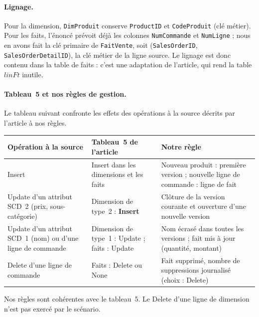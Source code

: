 \documentclass[10pt,a4paper]{article}
\begin{document}
\paragraph{Lignage.} Pour la dimension, \texttt{DimProduit} conserve \texttt{ProductID} et \texttt{CodeProduit} (clé métier). Pour les faits, l'énoncé prévoit déjà les colonnes \texttt{NumCommande} et \texttt{NumLigne} ; nous en avons fait la clé primaire de \texttt{FaitVente}, soit (\texttt{SalesOrderID}, \texttt{SalesOrderDetailID}), la clé métier de la ligne source. Le lignage est donc contenu dans la table de faits : c'est une adaptation de l'article, qui rend la table $linFt$ inutile.

\paragraph{Tableau~5 et nos règles de gestion.} Le tableau suivant confronte les effets des opérations à la source décrits par l'article à nos règles.

\smallskip
\begingroup\small
\begin{tabularx}{\textwidth}{@{}>{\raggedright\arraybackslash}p{3.6cm}>{\raggedright\arraybackslash}p{4.6cm}X@{}}
\toprule
Opération à la source & Tableau~5 de l'article & Notre règle \\
\midrule
Insert & Insert dans les dimensions et les faits & Nouveau produit : première version ; nouvelle ligne de commande : ligne de fait \\
Update d'un attribut SCD~2 (prix, sous-catégorie) & Dimension de type~2 : \textbf{Insert} & Clôture de la version courante et ouverture d'une nouvelle version \\
Update d'un attribut SCD~1 (nom) ou d'une ligne de commande & Dimension de type~1 : Update ; faits : Update & Nom écrasé dans toutes les versions ; fait mis à jour (quantité, montant) \\
Delete d'une ligne de commande & Faits : Delete ou None & Fait supprimé, nombre de suppressions journalisé (choix : Delete) \\
\bottomrule
\end{tabularx}
\endgroup

Nos règles sont cohérentes avec le tableau~5. Le Delete d'une ligne de dimension n'est pas exercé par le scénario.
\end{document}
